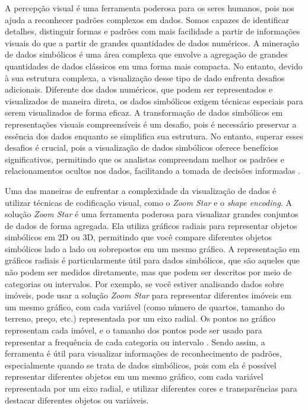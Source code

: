 A percepção visual é uma ferramenta poderosa para os seres humanos, pois nos ajuda a reconhecer padrões complexos em dados. Somos capazes de identificar detalhes, distinguir formas e padrões com mais facilidade a partir de informações visuais do que a partir de grandes quantidades de dados numéricos. A mineração de dados simbólicos é uma área complexa que envolve a agregação de grandes quantidades de dados clássicos em uma forma mais compacta. No entanto, devido à sua estrutura complexa, a visualização desse tipo de dado enfrenta desafios adicionais. Diferente dos dados numéricos, que podem ser representados e visualizados de maneira direta, os dados simbólicos exigem técnicas especiais para serem visualizados de forma eficaz. A transformação de dados simbólicos em representações visuais compreensíveis é um desafio, pois é necessário preservar a essência dos dados enquanto se simplifica sua estrutura. No entanto, superar esses desafios é crucial, pois a visualização de dados simbólicos oferece benefícios significativos, permitindo que os analistas compreendam melhor os padrões e relacionamentos ocultos nos dados, facilitando a tomada de decisões informadas \cite{Umbleja2020}.

Uma das maneiras de enfrentar a complexidade da visualização de dados é utilizar técnicas de codificação visual, como o \textit{Zoom Star} e o \textit{shape encoding}. A solução \textit{Zoom Star} é uma ferramenta poderosa para visualizar grandes conjuntos de dados de forma agregada. Ela utiliza gráficos radiais para representar objetos simbólicos em 2D ou 3D, permitindo que você compare diferentes objetos simbólicos lado a lado ou sobrepostos em um mesmo gráfico. A representação em gráficos radiais é particularmente útil para dados simbólicos, que são aqueles que não podem ser medidos diretamente, mas que podem ser descritos por meio de categorias ou intervalos. Por exemplo, se você estiver analisando dados sobre imóveis, pode usar a solução \textit{Zoom Star} para representar diferentes imóveis em um mesmo gráfico, com cada variável (como número de quartos, tamanho do terreno, preço, etc.) representada por um eixo radial. Os pontos no gráfico representam cada imóvel, e o tamanho dos pontos pode ser usado para representar a frequência de cada categoria ou intervalo \cite{zoomstar}. Sendo assim, a ferramenta é útil para visualizar informações de reconhecimento de padrões, especialmente quando se trata de dados simbólicos, pois com ela é possível representar diferentes objetos em um mesmo gráfico, com cada variável representada por um eixo radial, e utilizar diferentes cores e transparências para destacar diferentes objetos ou variáveis.

